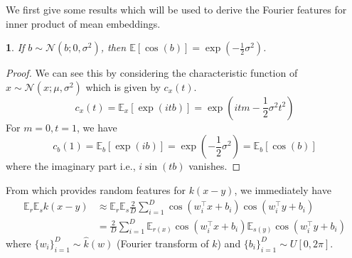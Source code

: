 \documentclass[english]{article}
\theoremstyle{plain}
\theoremstyle{plain}
\newtheorem{lem}[thm]{\protect\lemmaname}
\providecommand{\lemmaname}{Lemma}
\begin{document}
We first give some results which will be used to derive the Fourier
features for inner product of mean embeddings.
\begin{lem}
If $b\sim\mathcal{N}(b;0,\sigma^{2})$, then $\mathbb{E}[\cos(b)]=\exp\left(-\frac{1}{2}\sigma^{2}\right)$.\label{lemma:e_cos}\end{lem}
\begin{proof}
We can see this by considering the characteristic function of $x\sim\mathcal{N}(x;\mu,\sigma^{2})$
which is given by $c_{x}(t)$.
\[
c_{x}(t)=\mathbb{E}_{x}\left[\exp\left(itb\right)\right]=\exp\left(itm-\frac{1}{2}\sigma^{2}t^{2}\right)
\]
For $m=0,t=1$, we have 
\[
c_{b}(1)=\mathbb{E}_{b}\left[\exp(ib)\right]=\exp\left(-\frac{1}{2}\sigma^{2}\right)=\mathbb{E}_{b}\left[\cos(b)\right]
\]
where the imaginary part  i.e., $i\sin(tb)$ vanishes.
\end{proof}
%


From  which provides random features for $k(x-y)$,
we immediately have
\begin{align*}
\mathbb{E}_{r}\mathbb{E}_{s}k(x-y) & \approx\mathbb{E}_{r}\mathbb{E}_{s}\frac{2}{D}\sum_{i=1}^{D}\cos\left(w_{i}^{\top}x+b_{i}\right)\cos\left(w_{i}^{\top}y+b_{i}\right)\\
 & =\frac{2}
 {D}\sum_{i=1}^{D}\mathbb{E}_{r(x)}\cos\left(w_{i}^{\top}x+b_{i}\right)\mathbb{E}_{s(y)}\cos\left(w_{i
 }^{\top}y+b_{i}\right)
\end{align*}
where $\{w_{i}\}_{i=1}^{D}\sim\hat{k}(w)$ (Fourier transform of $k$)
and $\{b_{i}\}_{i=1}^{D}\sim U\left[0,2\pi\right]$. 
\end{document}
